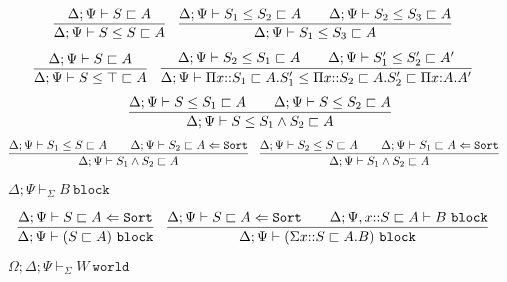 \documentclass[letterpaper, 11pt]{article}
\newcommand{\Lar}{\Leftarrow}
\newcommand{\Sort}{\texttt{Sort}}
\newcommand{\block}{\texttt{block}}
\newcommand{\world}{\texttt{world}}
\begin{document}
    \begin{align*}
      & \infer{\Delta; \Psi \vdash S \leq S \sqsubset A}{\Delta; \Psi \vdash S \sqsubset A} &
      & \infer{\Delta; \Psi \vdash S_1 \leq S_3 \sqsubset A}
        {
          \Delta; \Psi \vdash S_1 \leq S_2 \sqsubset A
          &&
          \Delta; \Psi \vdash S_2 \leq S_3 \sqsubset A
        }
    \end{align*}
    \begin{align*}
      & \infer{\Delta; \Psi \vdash S \leq \top \sqsubset A}{\Delta; \Psi \vdash S \sqsubset A} &
      & \infer{\Delta; \Psi \vdash \Pi x{::}S_1 \sqsubset A. S_1' \leq \Pi x{::}S_2 \sqsubset A. S_2' \sqsubset \Pi x{:}A.A'}
        {
          \Delta; \Psi \vdash S_2 \leq S_1 \sqsubset A
          &&
          \Delta; \Psi \vdash S_1' \leq S_2' \sqsubset A'
        }
    \end{align*}
    \begin{align*}
      \infer{\Delta; \Psi \vdash S \leq S_1 \land S_2 \sqsubset A}
            { 
              \Delta; \Psi \vdash S \leq S_1 \sqsubset A
              &&
              \Delta; \Psi \vdash S \leq S_2 \sqsubset A
            }
    \end{align*}
    \begin{align*}
      & \infer{\Delta; \Psi \vdash S_1 \land S_2 \sqsubset A}
        { 
          \Delta; \Psi \vdash S_1 \leq S \sqsubset A
          &&
          \Delta; \Psi \vdash S_2 \sqsubset A \Lar \Sort
        } &
      & \infer{\Delta; \Psi \vdash S_1 \land S_2 \sqsubset A}
        { 
          \Delta; \Psi \vdash S_2 \leq S \sqsubset A
          &&
          \Delta; \Psi \vdash S_1 \sqsubset A \Lar \Sort
        }
    \end{align*}

    $\boxed{\Delta; \Psi \vdash_\Sigma B \ \block}$
    
    \begin{align*}
      & \infer{\Delta; \Psi \vdash (S \sqsubset A) \ \block}
              {
                \Delta; \Psi \vdash S \sqsubset A \Lar \Sort
              } &
      & \infer{\Delta; \Psi \vdash (\Sigma x{::}S \sqsubset A. B) \ \block}
              {
                \Delta; \Psi \vdash S \sqsubset A \Lar \Sort
                &&
                \Delta; \Psi, x{::} S \sqsubset A \vdash B \ \block
              }
    \end{align*}
    
    $\boxed{\Omega; \Delta; \Psi \vdash_\Sigma W \ \world}$
\end{document}
